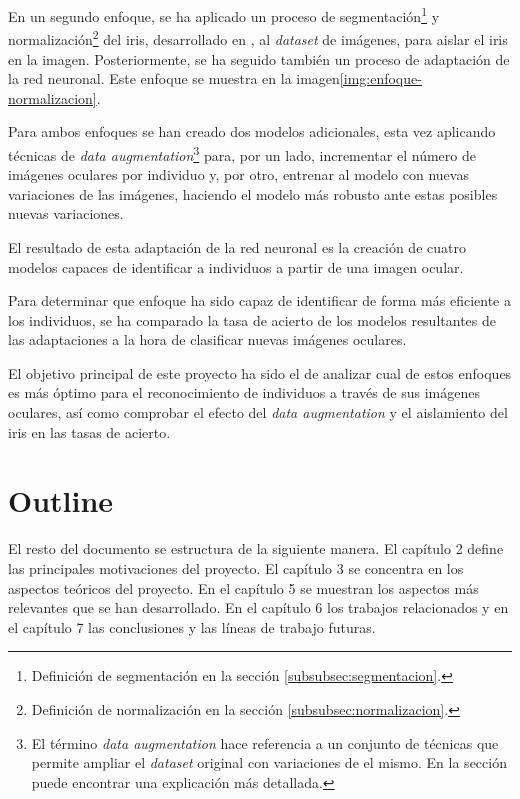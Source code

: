 En un segundo enfoque, se ha aplicado un proceso de segmentación\footnote{Definición de segmentación en la sección \ref{subsubsec:segmentacion}.} y normalización\footnote{Definición de normalización en la sección \ref{subsubsec:normalizacion}.} del iris, desarrollado en \cite{tfg_iris_2020}, al \textit{dataset} de imágenes, para aislar el iris en la imagen. Posteriormente, se ha seguido también un proceso de adaptación de la red neuronal. Este enfoque se muestra en la imagen\ref{img:enfoque-normalizacion}.



Para ambos enfoques se han creado dos modelos adicionales, esta vez aplicando técnicas de \textit{data augmentation}\footnote{El término \textit{data augmentation} hace referencia a un conjunto de técnicas que permite ampliar el \textit{dataset} original con variaciones de el mismo. En la sección  puede encontrar una explicación más detallada.} para, por un lado, incrementar el número de imágenes oculares por individuo y, por otro, entrenar al modelo con nuevas variaciones de las imágenes, haciendo el modelo más robusto ante estas posibles nuevas variaciones.

El resultado de esta adaptación de la red neuronal es la creación de cuatro modelos capaces de identificar a individuos a partir de una imagen ocular. 

Para determinar que enfoque ha sido capaz de identificar de forma más eficiente a los individuos, se ha comparado la tasa de acierto de los modelos resultantes de las adaptaciones a la hora de clasificar nuevas imágenes oculares. 

El objetivo principal de este proyecto ha sido el de analizar cual de estos enfoques es más óptimo para el reconocimiento de individuos a través de sus imágenes oculares, así como comprobar el efecto del \textit{data augmentation } y el aislamiento del iris en las tasas de acierto.

\section{Outline}

El resto del documento se estructura de la siguiente manera. El capítulo 2  define las principales motivaciones del proyecto. El capítulo 3  se concentra en los aspectos teóricos del proyecto. En el capítulo 5  se muestran los aspectos
más relevantes que se han desarrollado. En el capítulo 6  los trabajos relacionados y en el capítulo 7  las conclusiones y las líneas de trabajo futuras.
